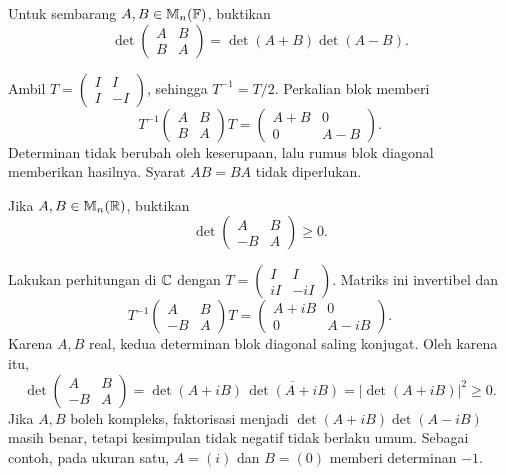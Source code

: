 \begin{exam}
      Untuk sembarang $A,B\in\mathbb{M}_n(\mathbb{F})$, buktikan
      \[
            \det\begin{pmatrix}A&B\\B&A\end{pmatrix}
            =\det(A+B)\det(A-B).
      \]
\end{exam}
\begin{solution}
      Ambil $T=\left(\begin{smallmatrix}I&I\\I&-I\end{smallmatrix}\right)$,
      sehingga $T^{-1}=T/2$. Perkalian blok memberi
      \[
            T^{-1}\begin{pmatrix}A&B\\B&A\end{pmatrix}T
            =\begin{pmatrix}A+B&0\\0&A-B\end{pmatrix}.
      \]
      Determinan tidak berubah oleh keserupaan, lalu rumus blok diagonal
      memberikan hasilnya. Syarat $AB=BA$ tidak diperlukan.
\end{solution}

\begin{exam}
      Jika $A,B\in\mathbb{M}_n(\mathbb{R})$, buktikan
      \[
            \det\begin{pmatrix}A&B\\-B&A\end{pmatrix}\ge0.
      \]
\end{exam}
\begin{solution}
      Lakukan perhitungan di $\mathbb{C}$ dengan
      $T=\left(\begin{smallmatrix}I&I\\iI&-iI\end{smallmatrix}\right)$.
      Matriks ini invertibel dan
      \[
            T^{-1}\begin{pmatrix}A&B\\-B&A\end{pmatrix}T
            =\begin{pmatrix}A+iB&0\\0&A-iB\end{pmatrix}.
      \]
      Karena $A,B$ real, kedua determinan blok diagonal saling konjugat.
      Oleh karena itu,
      \[
            \det\begin{pmatrix}A&B\\-B&A\end{pmatrix}
            =\det(A+iB)\,\overline{\det(A+iB)}
            =|\det(A+iB)|^2\ge0.
      \]
      Jika $A,B$ boleh kompleks, faktorisasi menjadi $\det(A+iB)\det(A-iB)$
      masih benar, tetapi kesimpulan tidak negatif tidak berlaku umum.
      Sebagai contoh, pada ukuran satu, $A=(i)$ dan $B=(0)$ memberi determinan $-1$.
\end{solution}

